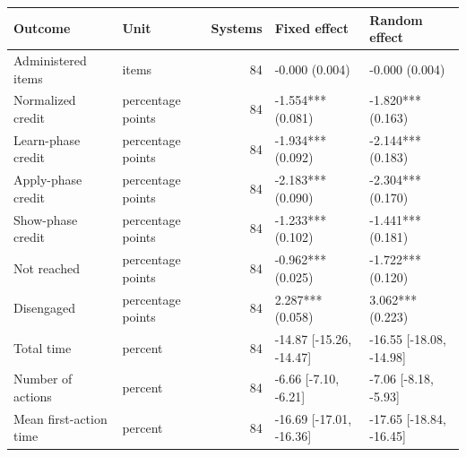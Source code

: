 \begin{tabular}{llrll}
\toprule
Outcome & Unit & Systems & Fixed effect & Random effect \\
\midrule
Administered items & items & 84 & -0.000 (0.004) & -0.000 (0.004) \\
Normalized credit & percentage points & 84 & -1.554*** (0.081) & -1.820*** (0.163) \\
Learn-phase credit & percentage points & 84 & -1.934*** (0.092) & -2.144*** (0.183) \\
Apply-phase credit & percentage points & 84 & -2.183*** (0.090) & -2.304*** (0.170) \\
Show-phase credit & percentage points & 84 & -1.233*** (0.102) & -1.441*** (0.181) \\
Not reached & percentage points & 84 & -0.962*** (0.025) & -1.722*** (0.120) \\
Disengaged & percentage points & 84 & 2.287*** (0.058) & 3.062*** (0.223) \\
Total time & percent & 84 & -14.87 [-15.26, -14.47] & -16.55 [-18.08, -14.98] \\
Number of actions & percent & 84 & -6.66 [-7.10, -6.21] & -7.06 [-8.18, -5.93] \\
Mean first-action time & percent & 84 & -16.69 [-17.01, -16.36] & -17.65 [-18.84, -16.45] \\
\bottomrule
\end{tabular}

